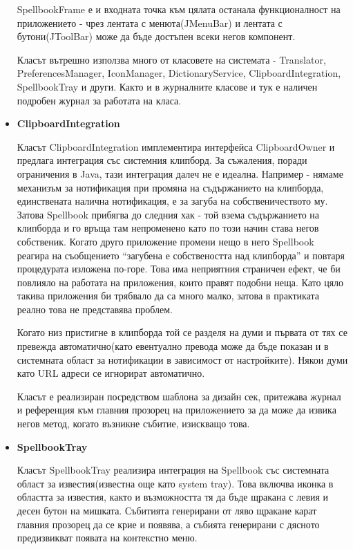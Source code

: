 \begin{itemize}
    SpellbookFrame е и входната точка към цялата останала
    функционалност на приложението - чрез лентата с менюта(JMenuBar) и лентата с
    бутони(JToolBar) може да бъде достъпен всеки негов компонент. 

    Класът вътрешно използва много от класовете на системата -
    Translator, PreferencesManager, IconManager, DictionaryService, 
    ClipboardIntegration, SpellbookTray и други. Както и в журналните
    класове и тук е наличен подробен журнал за работата на класа.

    \item \textbf{ClipboardIntegration}

      Класът ClipboardIntegration имплементира интерфейса
      ClipboardOwner и предлага интеграция със системния
      клипборд. За съжаления, поради ограничения в Java, тази
      интеграция далеч не е идеална. Например - нямаме механизъм за
      нотификация при промяна на съдържанието на клипборда,
      единствената налична нотификация, е за загуба на
      собственичеството му. Затова Spellbook прибягва до следния хак -
      той взема съдържанието на клипборда и го връща там непроменено
      като по този начин става негов собственик. Когато друго
      приложение промени нещо в него Spellbook реагира на съобщението
      "`загубена е собствеността над клипборда"' и повтаря процедурата
      изложена по-горе. Това има неприятния страничен ефект, че би
      повлияло на работата на приложения, които правят подобни
      неща. Като цяло такива приложения би трябвало да са много малко,
      затова в практиката реално това не представява проблем. 

      Когато низ пристигне в клипборда той се разделя на думи и
      първата от тях се превежда автоматично(като евентуално превода
      може да бъде показан и в системната област за нотификации в
      зависимост от настройките). Някои думи като URL адреси се
      игнорират автоматично.

      Класът е реализиран посредством шаблона за дизайн сек, притежава
      журнал и референция към главния прозорец на приложението за да
      може да извика негов метод, когато възникне събитие, изискващо това.
    \item \textbf{SpellbookTray}

      Класът SpellbookTray реализира интеграция на Spellbook със
      системната област за известия(известна още като system
      tray). Това включва иконка в областта за известия, както и
      възможността тя да бъде щракана с левия и десен бутон на
      мишката. Събитията генерирани от ляво щракане карат главния
      прозорец да се крие и появява, а събията генерирани с дясното
      предизвикват появата на контекстно меню.


\end{itemize}
